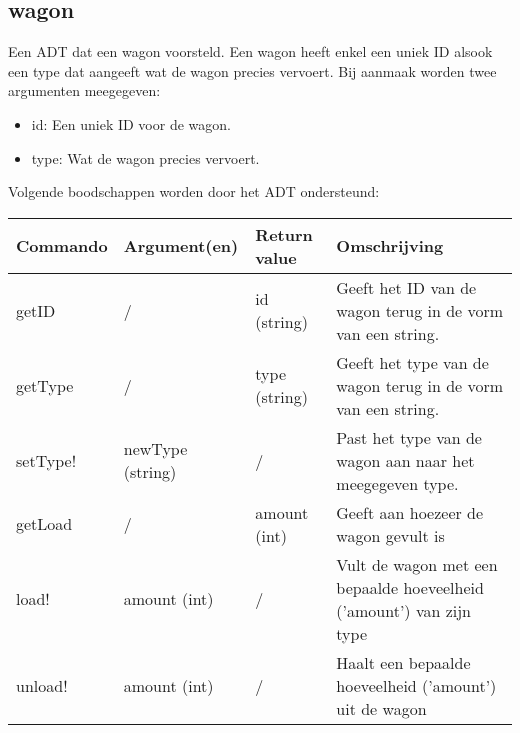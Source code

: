 \documentclass{article}
\begin{document}
\subsection{wagon} %
Een ADT dat een wagon voorsteld. Een wagon heeft enkel een uniek ID alsook een type dat aangeeft wat de wagon precies vervoert. Bij aanmaak worden twee argumenten meegegeven:
\begin{itemize}
  \item id: Een uniek ID voor de wagon.
  \item type: Wat de wagon precies vervoert.
\end{itemize}
Volgende boodschappen worden door het ADT ondersteund:
\begin{center}
    \begin{tabular}{ | l | l | l | p{8cm} |}
    \hline
    Commando & Argument(en) & Return value & Omschrijving \\ \hline
    getID & / & id (string) & Geeft het ID van de wagon terug in de vorm van een string. \\ \hline
    getType & / & type (string) & Geeft het type van de wagon terug in de vorm van een string. \\ \hline
    setType! & newType (string) & / & Past het type van de wagon aan naar het meegegeven type. \\ \hline
    getLoad & / & amount (int) & Geeft aan hoezeer de wagon gevult is \\ \hline
    load! & amount (int) & / & Vult de wagon met een bepaalde hoeveelheid ('amount') van zijn type \\ \hline
    unload! & amount (int) & / & Haalt een bepaalde hoeveelheid ('amount') uit de wagon \\ \hline
    \end{tabular}
\end{center}

\newpage
\end{document}
